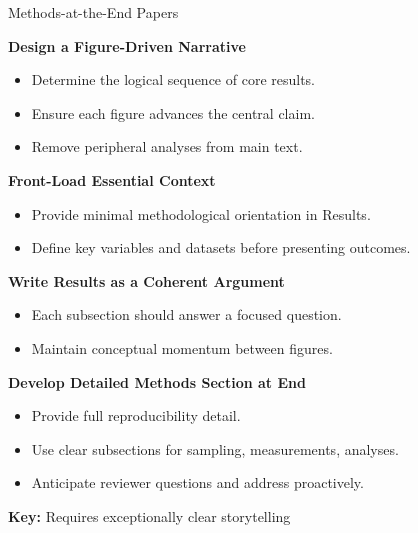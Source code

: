 \documentclass{beamer}
\begin{document}
\begin{frame}{Methods-at-the-End Papers}
\fontsize{9pt}{10pt}\selectfont


\textbf{Design a Figure-Driven Narrative}
\begin{itemize}
    \item Determine the logical sequence of core results.
    \item Ensure each figure advances the central claim.
    \item Remove peripheral analyses from main text.
\end{itemize}

\textbf{Front-Load Essential Context}
\begin{itemize}
    \item Provide minimal methodological orientation in Results.
    \item Define key variables and datasets before presenting outcomes.
\end{itemize}

\textbf{Write Results as a Coherent Argument}
\begin{itemize}
    \item Each subsection should answer a focused question.
    \item Maintain conceptual momentum between figures.
\end{itemize}

\textbf{Develop Detailed Methods Section at End}
\begin{itemize}
    \item Provide full reproducibility detail.
    \item Use clear subsections for sampling, measurements, analyses.
    \item Anticipate reviewer questions and address proactively.
\end{itemize}

\textbf{Key:}
Requires exceptionally clear storytelling

\end{frame}
\end{document}
